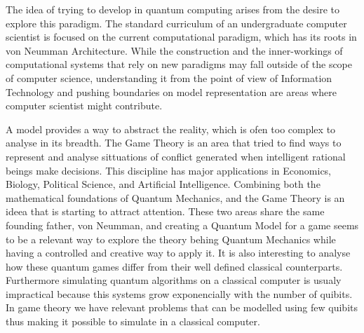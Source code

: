 The idea of trying to develop in quantum computing arises from the desire to explore this paradigm. The standard curriculum of an undergraduate computer scientist is focused on the current computational paradigm, which has its roots in von Neumman Architecture\cite{neumann45edvac}. While the construction and the inner-workings of computational systems that rely on new paradigms may fall outside of the scope of computer science, understanding it from the point of view of Information Technology and pushing boundaries on model representation are areas where computer scientist might contribute.

A model provides a way to abstract the reality, which is ofen too complex to analyse in its breadth. The Game Theory is an area that tried to find ways to represent and analyse sittuations of conflict generated when intelligent rational beings make decisions. This discipline has major applications in Economics, Biology, Political Science, and Artificial Intelligence. 
Combining both the mathematical foundations of Quantum Mechanics, and the Game Theory is an ideea that is starting to attract attention. These two areas share the same founding father, von Neumman, and creating a Quantum Model for a game seems to be a relevant way to explore the theory behing Quantum Mechanics while having a controlled and creative way to apply it. It is also interesting to analyse how these quantum games differ from their well defined classical counterparts. Furthermore  simulating quantum algorithms on a classical computer is usualy impractical because this systems grow exponencially with the number of quibits. In game theory we have relevant problems that can be modelled using few quibits thus making it possible to simulate in a classical computer.
